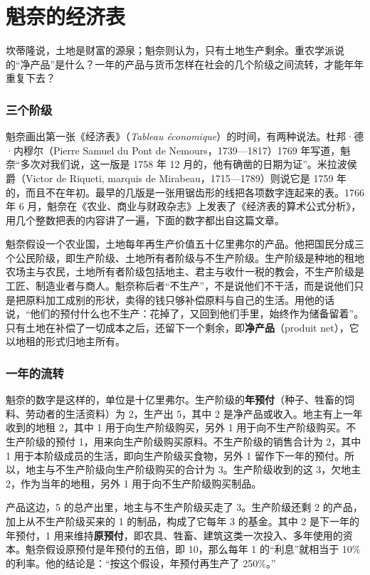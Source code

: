 \section{魁奈的经济表}\label{sec:merc-tableau}

坎蒂隆说，土地是财富的源泉；魁奈则认为，只有土地生产剩余。重农学派说的“净产品”是什么？一年的产品与货币怎样在社会的几个阶级之间流转，才能年年重复下去？

\subsubsection{三个阶级}
魁奈画出第一张《经济表》（\emph{Tableau économique}）的时间，有两种说法。杜邦·德·内穆尔（Pierre Samuel du Pont de Nemours，1739—1817）1769 年写道，魁奈“多次对我们说，这一版是 1758 年 12 月的，他有确凿的日期为证”。米拉波侯爵（Victor de Riqueti, marquis de Mirabeau，1715—1789）则说它是 1759 年的，而且不在年初\cite{oncken1888}。最早的几版是一张用锯齿形的线把各项数字连起来的表。1766 年 6 月，魁奈在《农业、商业与财政杂志》上发表了《经济表的算术公式分析》，用几个整数把表的内容讲了一遍，下面的数字都出自这篇文章\cite{quesnay1766}。

魁奈假设一个农业国，土地每年再生产价值五十亿里弗尔的产品。他把国民分成三个公民阶级，即生产阶级、土地所有者阶级与不生产阶级\cite{quesnay1766}。生产阶级是种地的租地农场主与农民，土地所有者阶级包括地主、君主与收什一税的教会，不生产阶级是工匠、制造业者与商人。魁奈称后者“不生产”，不是说他们不干活，而是说他们只是把原料加工成别的形状，卖得的钱只够补偿原料与自己的生活。用他的话说，“他们的预付什么也不生产：花掉了，又回到他们手里，始终作为储备留着”\cite{quesnay1766}。只有土地在补偿了一切成本之后，还留下一个剩余，即\textbf{净产品}（produit net），它以地租的形式归地主所有。

\subsubsection{一年的流转}
魁奈的数字是这样的，单位是十亿里弗尔。生产阶级的\textbf{年预付}（种子、牲畜的饲料、劳动者的生活资料）为 2，生产出 5，其中 2 是净产品或收入。地主有上一年收到的地租 2，其中 1 用于向生产阶级购买，另外 1 用于向不生产阶级购买。不生产阶级的预付 1，用来向生产阶级购买原料\cite{quesnay1766}。不生产阶级的销售合计为 2，其中 1 用于本阶级成员的生活，即向生产阶级买食物，另外 1 留作下一年的预付\cite{quesnay1766}。所以，地主与不生产阶级向生产阶级购买的合计为 3。生产阶级收到的这 3，欠地主 2，作为当年的地租，另外 1 用于向不生产阶级购买制品\cite{quesnay1766}。

产品这边，5 的总产出里，地主与不生产阶级买走了 3。生产阶级还剩 2 的产品，加上从不生产阶级买来的 1 的制品，构成了它每年 3 的基金\cite{quesnay1766}。其中 2 是下一年的年预付，1 用来维持\textbf{原预付}，即农具、牲畜、建筑这类一次投入、多年使用的资本。魁奈假设原预付是年预付的五倍，即 10，那么每年 1 的“利息”就相当于 10\% 的利率\cite{quesnay1766}。他的结论是：“按这个假设，年预付再生产了 250\%。”\cite{quesnay1766}

